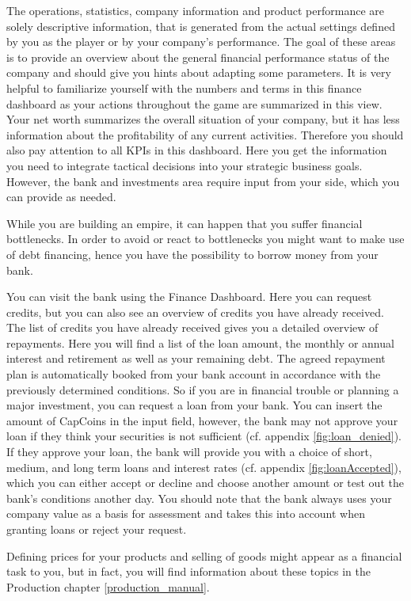  The operations, statistics, company information and product performance are solely descriptive information, that is generated from the actual settings defined by you as the player or by your company’s performance. The goal of these areas is to provide an overview about the general financial performance status of the company and should give you hints about adapting some parameters. 
It is very helpful to familiarize yourself with the numbers and terms in this finance dashboard as your actions throughout the game are summarized in this view. Your net worth summarizes the overall situation of your company, but it has less information about the profitability of any current activities. Therefore you should also pay attention to all KPIs in this dashboard. Here you get the information you need to integrate tactical decisions into your strategic business goals. 
 However, the bank and investments area require input from your side, which you can provide as needed. 

While you are building an empire, it can happen that you suffer financial bottlenecks. In order to avoid or react to bottlenecks you might want to make use of debt financing, hence you have the possibility to borrow money from your bank. 

You can visit the bank using the Finance Dashboard. Here you can request credits, but you can also see an overview of credits you have already received.
The list of credits you have already received gives you a detailed overview of repayments. Here you will find a list of the loan amount, the monthly or annual interest and retirement as well as your remaining debt. The agreed repayment plan is automatically booked from your bank account in accordance with the previously determined conditions.
So if you are in financial trouble or planning a major investment, you can request a loan from your bank. You can insert the amount of CapCoins in the input field, however, the bank may not approve your loan if they think your securities is not sufficient (cf. appendix \ref{fig:loan_denied}). If they approve your loan, the bank will provide you with a choice of short, medium, and long term loans and interest rates (cf. appendix  \ref{fig:loanAccepted}), which you can either accept or decline and choose another amount or test out the bank's conditions another day. You should note that the bank always uses your company value as a basis for assessment and takes this into account when granting loans or reject your request. 

Defining prices for your products and selling of goods might appear as a financial task to you, but in fact, you will find information about these topics in the Production chapter \ref{production_manual}.